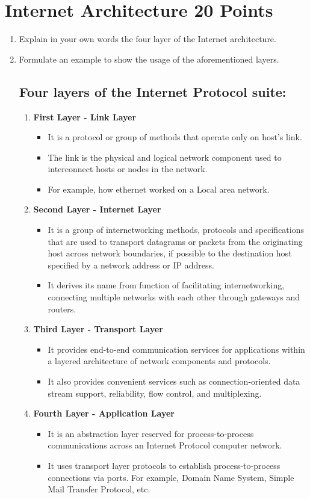 \documentclass{resources/WeSTassignment}
\begin{document}
\begin{enumerate}
\end{enumerate}

	
\section{Internet Architecture \hfill{20 Points}}
\begin{enumerate}
    \item Explain in your own words the four layer of the Internet architecture.
    \item Formulate an example to show the usage of the aforementioned layers.
\subsection{Four layers of the Internet Protocol suite:}
\begin{enumerate}
    \item \textbf{First Layer - Link Layer}
	\begin{itemize}
    		\item It is a protocol or group of methods that operate only on host's link.
		\item The link is the physical and logical network component used to interconnect hosts or nodes in the network.
		\item For example, how ethernet worked on a Local area network.
	\end{itemize}
    \item \textbf{Second Layer - Internet Layer}
	\begin{itemize}
    		\item It is a group of internetworking methods, protocols and specifications that are used to transport datagrams or packets from the originating host across network boundaries, if possible to the destination host specified by a network address or IP address.
		\item It derives its name from function of facilitating internetworking, connecting multiple networks with each other through gateways and routers.
	\end{itemize}
    \item \textbf{Third Layer - Transport Layer}
	\begin{itemize}
    		\item It provides end-to-end communication services for applications within a layered architecture of network components and protocols.
		\item It also provides convenient services such as connection-oriented data stream support, reliability, flow control, and multiplexing.
	\end{itemize}
    \item \textbf{Fourth Layer - Application Layer}
	\begin{itemize}
    		\item It is an abstraction layer reserved for process-to-process communications across an Internet Protocol computer network.
		\item It uses transport layer protocols to establish process-to-process connections via ports. For example, Domain Name System, Simple Mail Transfer Protocol, etc.
	\end{itemize}
\end{enumerate}

\end{enumerate}
\end{document}
